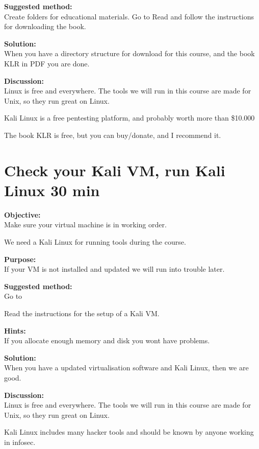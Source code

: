 \documentclass[a4paper,11pt,notitlepage]{report}
\begin{document}
{\bf Suggested method:}\\
Create folders for educational materials. Go to 
Read and follow the instructions for downloading the book.

{\bf Solution:}\\
When you have a directory structure for download for this course, and the book KLR in PDF you are done.

{\bf Discussion:}\\
Linux is free and everywhere. The tools we will run in this course are made for Unix, so they run great on Linux.

Kali Linux is a free pentesting platform, and probably worth more than \$10.000

The book KLR is free, but you can buy/donate, and I recommend it.

\chapter{Check your Kali VM, run Kali Linux 30 min}
\label{ex:basicVM}


{\bf Objective:}\\
Make sure your virtual machine is in working order.

We need a Kali Linux for running tools during the course.

{\bf Purpose:}\\
If your VM is not installed and updated we will run into trouble later.

{\bf Suggested method:}\\
Go to 

Read the instructions for the setup of a Kali VM.

{\bf Hints:}\\
If you allocate enough memory and disk you wont have problems.

{\bf Solution:}\\
When you have a updated virtualisation software and Kali Linux, then we are good.

{\bf Discussion:}\\
Linux is free and everywhere. The tools we will run in this course are made for Unix, so they run great on Linux.

Kali Linux includes many hacker tools and should be known by anyone working in infosec.
\end{document}

